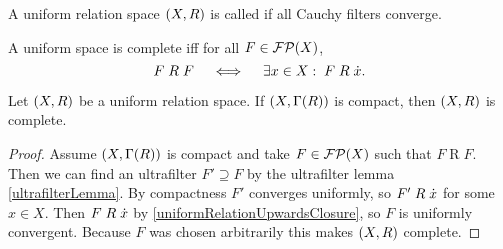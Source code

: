 \begin{definition}
A uniform relation space $\left( X,R \right)$ is called  if all Cauchy filters converge.
\end{definition}

A uniform space is complete iff for all $F\in\operatorname{\mathcal{FP}}(X)$,
\[ F\mathrel{R}F \quad\iff\quad \exists x\in X:\; F\mathrel{R}\dot{x}. \]

\begin{proposition} \label{compactImpliesComplete}
Let $\left( X,R \right)$ be a uniform relation space. If $\left( X,\Gamma(R) \right)$ is compact, then $\left( X,R \right)$ is complete.
\end{proposition}
\begin{proof}
Assume $\left( X,\Gamma(R) \right)$ is compact and take $F\in\operatorname{\mathcal{FP}}(X)$ such that $F\mathrel{R}F$. Then we can find an ultrafilter $F'\supseteq F$ by the ultrafilter lemma \ref{ultrafilterLemma}. By compactness $F'$ converges uniformly, so $F'\mathrel{R}\dot{x}$ for some $x\in X$. Then $F \mathrel{R}\dot{x}$ by \ref{uniformRelationUpwardsClosure}, so $F$ is uniformly convergent. Because $F$ was chosen arbitrarily this makes $\left( X,R \right)$ complete.
\end{proof}

